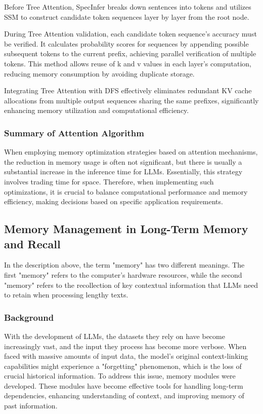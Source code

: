 \documentclass[conference]{IEEEtran}
\begin{document}
Before Tree Attention, SpecInfer breaks down sentences into tokens and utilizes SSM to construct candidate token sequences layer by layer from the root node.

During Tree Attention validation, each candidate token sequence's accuracy must be verified. It calculates probability scores for sequences by appending possible subsequent tokens to the current prefix, achieving parallel verification of multiple tokens. This method allows reuse of k and v values in each layer's computation, reducing memory consumption by avoiding duplicate storage.

Integrating Tree Attention with DFS effectively eliminates redundant KV cache allocations from multiple output sequences sharing the same prefixes, significantly enhancing memory utilization and computational efficiency.

\subsubsection{Summary of Attention Algorithm}
When employing memory optimization strategies based on attention mechanisms, the reduction in memory usage is often not significant, but there is usually a substantial increase in the inference time for LLMs. Essentially, this strategy involves trading time for space. Therefore, when implementing such optimizations, it is crucial to balance computational performance and memory efficiency, making decisions based on specific application requirements.

\subsection{Memory Management in Long-Term Memory and Recall}
In the description above, the term "memory" has two different meanings. The first "memory" refers to the computer's hardware resources, while the second "memory" refers to the recollection of key contextual information that LLMs need to retain when processing lengthy texts.
\subsubsection{Background}
With the development of LLMs, the datasets they rely on have become increasingly vast, and the input they process has become more verbose. When faced with massive amounts of input data, the model's original context-linking capabilities might experience a "forgetting" phenomenon, which is the loss of crucial historical information. To address this issue, memory modules were developed. These modules have become effective tools for handling long-term dependencies, enhancing understanding of context, and improving memory of past information.
\end{document}
